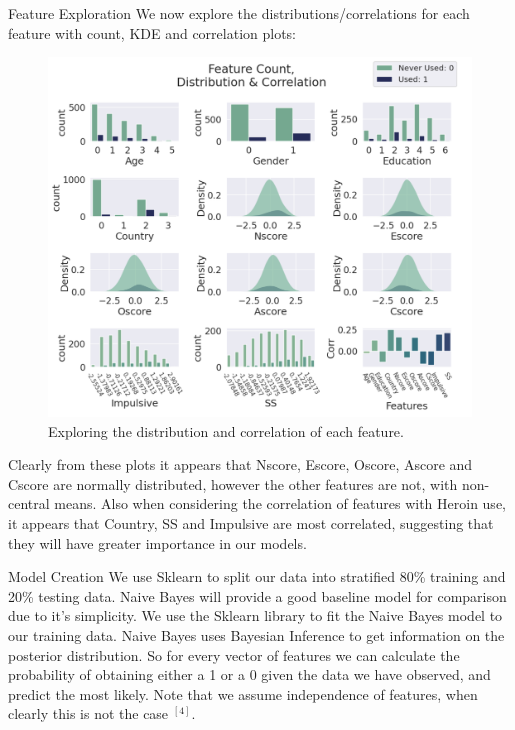 \documentclass[6pt, final, xcolor=table]{beamer}
\newlength{\colwidth}
\begin{document}
\begin{frame}[t]
\begin{columns}[t]
\begin{column}{\colwidth}
  \begin{block}{Feature Exploration}
    We now explore the distributions/correlations for each feature with count, KDE and correlation
    plots:
  \begin{figure}[h!]
    \centering
     \includegraphics[scale=1.2]{feature_plots.png}
    \caption{Exploring the distribution and correlation of each feature.}
    \label{fig:feature_plots}
    \end{figure}
    Clearly from these plots it appears that Nscore, Escore, Oscore, Ascore and Cscore
    are normally distributed, however the other features are not, with non-central means.
    Also when considering the correlation of features with Heroin use, it appears that Country, SS and Impulsive are most correlated, suggesting that they will have greater importance in our models.

  \end{block}

\begin{block}{Model Creation}
We use Sklearn to split our data into stratified 80\% training and 20\% testing data.
Naive Bayes will provide a good baseline model for comparison due to it's simplicity. 
We use the Sklearn library to fit the Naive Bayes model to our training data.
Naive Bayes uses Bayesian Inference to get information on the posterior 
distribution. So for every vector of features we can calculate the probability of obtaining
either a 1 or a 0 given the data we have observed, and predict the most likely. Note that we assume independence of features, when clearly this is not the case $^{[4]}$.


\end{block}
\end{column}
\end{columns}
\end{frame}
\end{document}
